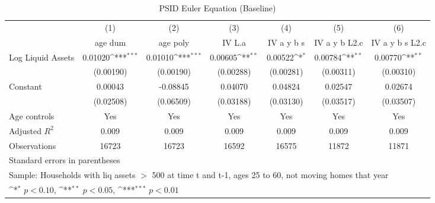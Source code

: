 {
\def\sym#1{\ifmmode^{#1}\else\(^{#1}\)\fi}
\begin{longtable}{l*{6}{c}}
\caption{PSID Euler Equation (Baseline)}\\
\toprule\endfirsthead\midrule\endhead\midrule\endfoot\endlastfoot
                    &\multicolumn{1}{c}{(1)}&\multicolumn{1}{c}{(2)}&\multicolumn{1}{c}{(3)}&\multicolumn{1}{c}{(4)}&\multicolumn{1}{c}{(5)}&\multicolumn{1}{c}{(6)}\\
                    &\multicolumn{1}{c}{age dum}&\multicolumn{1}{c}{age poly}&\multicolumn{1}{c}{IV L.a}&\multicolumn{1}{c}{IV a y b s}&\multicolumn{1}{c}{IV a y b L2.c}&\multicolumn{1}{c}{IV a y b s L2.c}\\
\midrule
Log Liquid Assets   &     0.01020\sym{***}&     0.01010\sym{***}&     0.00605\sym{**} &     0.00522\sym{*}  &     0.00784\sym{**} &     0.00770\sym{**} \\
                    &   (0.00190)         &   (0.00190)         &   (0.00288)         &   (0.00281)         &   (0.00311)         &   (0.00310)         \\
\addlinespace
Constant            &     0.00043         &    -0.08845         &     0.04070         &     0.04824         &     0.02547         &     0.02674         \\
                    &   (0.02508)         &   (0.06509)         &   (0.03188)         &   (0.03130)         &   (0.03517)         &   (0.03507)         \\
\addlinespace
Age controls        &         Yes         &         Yes         &         Yes         &         Yes         &         Yes         &         Yes         \\
\midrule
Adjusted \(R^{2}\)  &       0.009         &       0.009         &       0.009         &       0.009         &       0.009         &       0.009         \\
Observations        &       16723         &       16723         &       16592         &       16575         &       11872         &       11871         \\
\bottomrule
\multicolumn{7}{l}{\footnotesize Standard errors in parentheses}\\
\multicolumn{7}{l}{\footnotesize Sample: Households with liq assets $>$ 500 at time t and t-1, ages 25 to 60, not moving homes that year}\\
\multicolumn{7}{l}{\footnotesize \sym{*} \(p<0.10\), \sym{**} \(p<0.05\), \sym{***} \(p<0.01\)}\\
\end{longtable}
}
